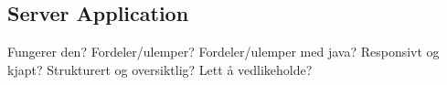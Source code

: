 \subsection{Server Application}
Fungerer den? Fordeler/ulemper? Fordeler/ulemper med java? Responsivt og kjapt? Strukturert og oversiktlig? Lett å vedlikeholde?